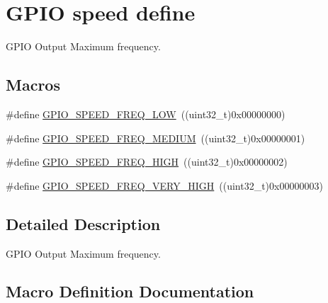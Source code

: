 \hypertarget{group___g_p_i_o__speed__define}{}\section{G\+P\+IO speed define}
\label{group___g_p_i_o__speed__define}


G\+P\+IO Output Maximum frequency.  


\subsection*{Macros}
\begin{DoxyCompactItemize}
\item 
\#define \hyperlink{group___g_p_i_o__speed__define_gab7916c4265bfa1b26a5205ea9c1caa4e}{G\+P\+I\+O\+\_\+\+S\+P\+E\+E\+D\+\_\+\+F\+R\+E\+Q\+\_\+\+L\+OW}~((uint32\+\_\+t)0x00000000)
\item 
\#define \hyperlink{group___g_p_i_o__speed__define_ga1724a25a9cf00ebf485daeb09cfa1e25}{G\+P\+I\+O\+\_\+\+S\+P\+E\+E\+D\+\_\+\+F\+R\+E\+Q\+\_\+\+M\+E\+D\+I\+UM}~((uint32\+\_\+t)0x00000001)
\item 
\#define \hyperlink{group___g_p_i_o__speed__define_gaef5898db71cdb957cd41f940b0087af8}{G\+P\+I\+O\+\_\+\+S\+P\+E\+E\+D\+\_\+\+F\+R\+E\+Q\+\_\+\+H\+I\+GH}~((uint32\+\_\+t)0x00000002)
\item 
\#define \hyperlink{group___g_p_i_o__speed__define_ga1944cf10e2ab172810d38b681d40b771}{G\+P\+I\+O\+\_\+\+S\+P\+E\+E\+D\+\_\+\+F\+R\+E\+Q\+\_\+\+V\+E\+R\+Y\+\_\+\+H\+I\+GH}~((uint32\+\_\+t)0x00000003)
\end{DoxyCompactItemize}


\subsection{Detailed Description}
G\+P\+IO Output Maximum frequency. 



\subsection{Macro Definition Documentation}
